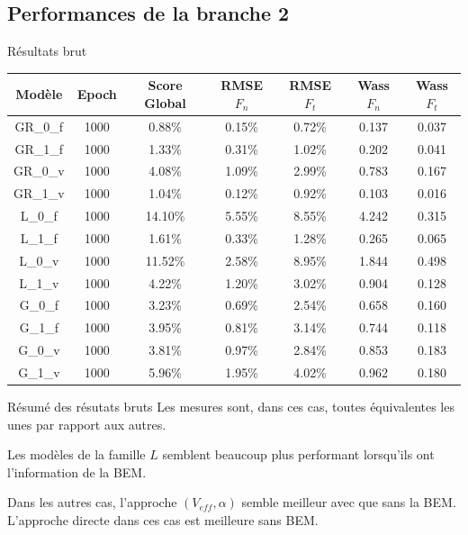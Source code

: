 \documentclass[
11pt,notheorems,hyperref={pdfauthor=whatever}
]{beamer}
\begin{document}
\subsection{Performances de la branche 2}
\begin{frame}{Résultats brut}

    \begin{tabular}{c c c c c c c}
        \hline
        Modèle & Epoch & Score Global & RMSE $F_n$ & RMSE $F_t$ & Wass $F_n$ & Wass $F_t$ \\
        \hline
        GR\_0\_f & 1000 & 0.88\% & 0.15\% & 0.72\% & 0.137 & 0.037 \\
        GR\_1\_f & 1000 & 1.33\% & 0.31\% & 1.02\% & 0.202 & 0.041 \\
        \hline
        GR\_0\_v & 1000 & 4.08\% & 1.09\% & 2.99\% & 0.783 & 0.167 \\
        GR\_1\_v & 1000 & 1.04\% & 0.12\% & 0.92\% & 0.103 & 0.016 \\
        \hline
        L\_0\_f  & 1000 & 14.10\% & 5.55\% & 8.55\% & 4.242 & 0.315 \\
        L\_1\_f  & 1000 & 1.61\% & 0.33\% & 1.28\% & 0.265 & 0.065 \\
        \hline
        L\_0\_v  & 1000 & 11.52\% & 2.58\% & 8.95\% & 1.844 & 0.498 \\
        L\_1\_v  & 1000 & 4.22\% & 1.20\% & 3.02\% & 0.904 & 0.128 \\
        \hline
        G\_0\_f  & 1000 & 3.23\% & 0.69\% & 2.54\% & 0.658 & 0.160 \\
        G\_1\_f  & 1000 & 3.95\% & 0.81\% & 3.14\% & 0.744 & 0.118 \\
        \hline
        G\_0\_v  & 1000 & 3.81\% & 0.97\% & 2.84\% & 0.853 & 0.183 \\
        G\_1\_v  & 1000 & 5.96\% & 1.95\% & 4.02\% & 0.962 & 0.180 \\
        \hline
    \end{tabular}
\end{frame}

\begin{frame}{Résumé des résutats bruts}
    Les mesures sont, dans ces cas, toutes équivalentes les unes par rapport aux autres.

    \vspace{0.3cm}
    
    Les modèles de la famille $L$ semblent beaucoup plus performant lorsqu'ils ont l'information de la BEM.

    \vspace{0.3cm}

    Dans les autres cas, l'approche $(V_{eff}, \alpha)$ semble meilleur avec que sans la BEM. L'approche directe dans ces cas est meilleure sans BEM.
\end{frame}
\end{document}
